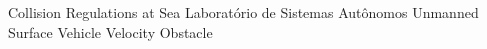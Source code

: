 \begin{acronym}
  {Collision Regulations at Sea}
      {Laboratório de Sistemas Autônomos}
      {Unmanned Surface Vehicle}
       {Velocity Obstacle}
\end{acronym}